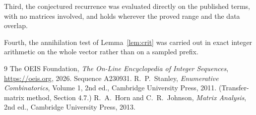\documentclass[11pt,a4paper]{article}
\theoremstyle{plain}
\theoremstyle{definition}
\begin{document}
Third, the conjectured recurrence was evaluated directly on the published terms, with no
matrices involved, and holds wherever the proved range and the data overlap.

Fourth, the annihilation test of Lemma~\ref{lem:crit} was carried out in exact integer
arithmetic on the whole vector rather than on a sampled prefix.

\begin{thebibliography}{9}
 The OEIS Foundation, \emph{The On-Line Encyclopedia of Integer
Sequences}, \url{https://oeis.org}, 2026. Sequence A230931.
 R.~P.~Stanley, \emph{Enumerative Combinatorics}, Volume 1, 2nd ed.,
Cambridge University Press, 2011. (Transfer-matrix method, Section 4.7.)
 R.~A.~Horn and C.~R.~Johnson, \emph{Matrix Analysis}, 2nd ed., Cambridge
University Press, 2013.
\end{thebibliography}
\end{document}
